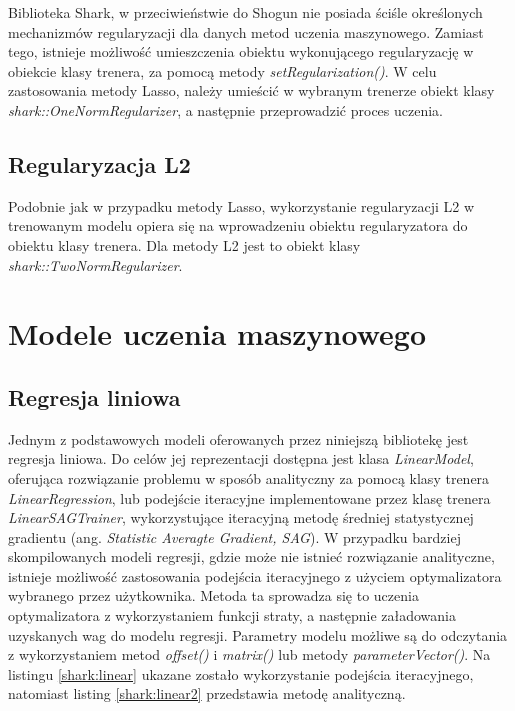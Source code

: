 Biblioteka Shark, w przeciwieństwie do Shogun nie posiada ściśle określonych mechanizmów regularyzacji dla danych metod uczenia maszynowego. Zamiast tego, istnieje możliwość umieszczenia obiektu wykonującego regularyzację w obiekcie klasy trenera, za pomocą metody \textit{setRegularization()}. W celu zastosowania metody Lasso, należy umieścić w wybranym trenerze obiekt klasy \textit{shark::OneNormRegularizer}, a następnie przeprowadzić proces uczenia.

\subsection{Regularyzacja L2}

Podobnie jak w przypadku metody Lasso, wykorzystanie regularyzacji L2 w trenowanym modelu opiera się na wprowadzeniu obiektu regularyzatora do obiektu klasy trenera. Dla metody L2 jest to obiekt klasy \textit{shark::TwoNormRegularizer}.


\section{Modele uczenia maszynowego}

\subsection{Regresja liniowa}

Jednym z podstawowych modeli oferowanych przez niniejszą bibliotekę jest regresja liniowa. Do celów jej reprezentacji dostępna jest klasa \textit{LinearModel}, oferująca rozwiązanie problemu w sposób analityczny za pomocą klasy trenera \textit{LinearRegression}, lub podejście iteracyjne implementowane przez klasę trenera \textit{LinearSAGTrainer}, wykorzystujące iteracyjną metodę średniej statystycznej gradientu (ang. \textit{Statistic Averagte Gradient, SAG}). W przypadku bardziej skompilowanych modeli regresji, gdzie może nie istnieć rozwiązanie analityczne, istnieje możliwość zastosowania podejścia iteracyjnego z użyciem optymalizatora wybranego przez użytkownika. Metoda ta sprowadza się to uczenia optymalizatora z wykorzystaniem funkcji straty, a następnie załadowania uzyskanych wag do modelu regresji. Parametry modelu możliwe są do odczytania z wykorzystaniem metod \textit{offset()} i \textit{matrix()} lub metody \textit{parameterVector()}. Na listingu \ref{shark:linear} ukazane zostało wykorzystanie podejścia iteracyjnego, natomiast listing \ref{shark:linear2} przedstawia metodę analityczną.

